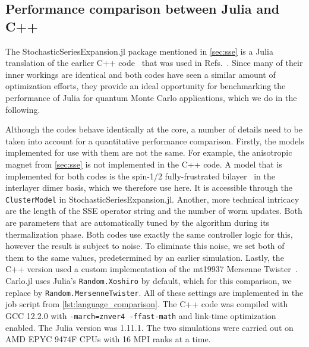 \documentclass{SciPost}
\begin{document}
\subsection{Performance comparison between Julia and C++}
The StochasticSeriesExpansion.jl package mentioned in \cref{sec:sse} is a Julia translation of the earlier C++ code~\cite{WeberFrust2024} that was used in Refs.~\cite{Jimenez2021,Weber2022,WeberCluster2022,WeberThermal2022,weber_cavityrenormalized_2023}. Since many of their inner workings are identical and both codes have seen a similar amount of optimization efforts, they provide an ideal opportunity for benchmarking the performance of Julia for quantum Monte Carlo applications, which we do in the following.

Although the codes behave identically at the core, a number of details need to be taken into account for a quantitative performance comparison. Firstly, the models implemented for use with them are not the same. For example, the anisotropic magnet from \cref{sec:sse} is not implemented in the C++ code. A model that is implemented for both codes is the spin-1/2 fully-frustrated bilayer~\cite{MullerHartmannExact2000,Alet2016} in the interlayer dimer basis, which we therefore use here. It is accessible through the \texttt{ClusterModel} in StochasticSeriesExpansion.jl. Another, more technical intricacy are the length of the SSE operator string and the number of worm updates. Both are parameters that are automatically tuned by the algorithm during its thermalization phase. Both codes use exactly the same controller logic for this, however the result is subject to noise. To eliminate this noise, we set both of them to the same values, predetermined by an earlier simulation. Lastly, the C++ version used a custom implementation of the mt19937 Mersenne Twister~\cite{Matsumoto1998}. Carlo.jl uses Julia’s \texttt{Random.Xoshiro} by default, which for this comparison, we replace by \texttt{Random.MersenneTwister}. All of these settings are implemented in the job script from \cref{lst:language_comparison}. The C++ code was compiled with GCC 12.2.0 with \texttt{-march=znver4 -ffast-math} and link-time optimization enabled. The Julia version was 1.11.1. The two simulations were carried out on AMD EPYC 9474F CPUs with 16 MPI ranks at a time.
\end{document}
